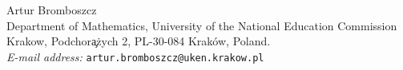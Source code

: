 \documentclass[12pt]{article}
\theoremstyle{plain}
\theoremstyle{definition}
\begin{document}
Artur Bromboszcz \\
Department of Mathematics,
University of the National Education Commission Krakow,
Podchor\c a\.zych 2,
PL-30-084 Krak\'ow, Poland. \\
\nopagebreak
\textit{E-mail address:} \texttt{artur.bromboszcz@uken.krakow.pl}
\bigskip
\end{document}
